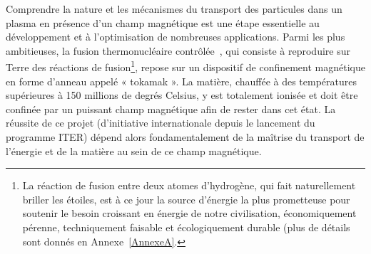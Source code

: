 \renewcommand{\thefigure}{\arabic{figure}}
\renewcommand{\theequation}{\arabic{equation}}
\begin{refsection}
Comprendre la nature et les mécanismes du transport des particules dans un
plasma en présence d'un champ magnétique est une étape essentielle au
développement et à l'optimisation de nombreuses applications.
Parmi les plus ambitieuses, la fusion thermonucléaire
contrôlée~\parencite{Wesson}, qui consiste à reproduire sur Terre des réactions
de fusion\footnote{La réaction de fusion entre deux atomes d'hydrogène, qui fait naturellement briller les
étoiles, est à ce jour la source d'énergie la plus prometteuse pour soutenir le besoin croissant en énergie de notre civilisation,
économiquement pérenne, techniquement faisable et écologiquement durable
(plus de détails sont donnés en Annexe~\ref{AnnexeA}.}, repose sur un dispositif
de confinement magnétique en forme d'anneau appelé « tokamak ».
La matière, chauffée à des températures supérieures à 150 millions de degrés
Celsius, y est totalement ionisée et doit être confinée par un puissant champ magnétique afin
de rester dans cet état. La réussite de ce projet (d'initiative
internationale depuis le lancement du programme ITER) dépend alors
fondamentalement de la maîtrise du transport de l'énergie et de la matière au
sein de ce champ magnétique.


\end{refsection}
